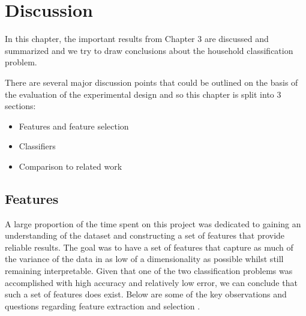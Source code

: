 \chapter{Discussion}

In this chapter, the important results from Chapter 3 are discussed and summarized and we try to draw conclusions about the household classification problem.

There are several major discussion points that could be outlined on the basis of the evaluation of the experimental design and so this chapter is split into 3 sections:

\begin{itemize}
\item Features and feature selection
\item Classifiers
\item Comparison to related work
\end{itemize}


\section{Features}

A large proportion of the time spent on this project was dedicated to gaining an understanding of the dataset and constructing a set of features that provide reliable results. The goal was to have a set of features that capture as much of the variance of the data in as low of a dimensionality as possible whilst still remaining interpretable. Given that one of the two classification problems was accomplished with high accuracy and relatively low error, we can conclude that such a set of features does exist. Below are some of the key observations and questions regarding feature extraction and selection .


